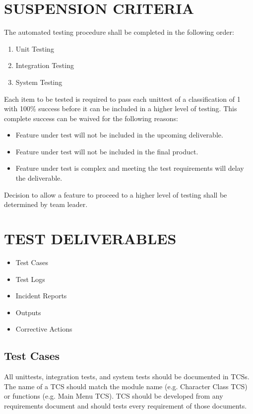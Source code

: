 \documentclass[report]{article}
\begin{document}
\section[SUSPENSION CRITERIA]{SUSPENSION CRITERIA}
The automated testing procedure shall be completed in the following order:
\begin{enumerate}
\item Unit Testing
\item Integration Testing
\item System Testing
\end{enumerate}
Each item to be tested is required to pass each unittest of a classification of 1 with 100\% success before it can be included in a higher level of testing. This complete success can be waived for the following reasons:
\begin{itemize}
\item Feature under test will not be included in the upcoming deliverable.
\item Feature under test will not be included in the final product.
\item Feature under test is complex and meeting the test requirements will delay the deliverable.
\end{itemize}
Decision to allow a feature to proceed to a higher level of testing shall be determined by team leader.

\section[TEST DELIVERABLES]{TEST DELIVERABLES}
\begin{itemize}
\item Test Cases
\item Test Logs
\item Incident Reports
\item Outputs
\item Corrective Actions
\end{itemize}

\subsection{Test Cases}

All unittests, integration tests, and system tests should be documented in TCSs. The name of a TCS should match the module name (e.g. Character Class TCS) or functions (e.g. Main Menu TCS). TCS should be developed from any requirements document and should tests every requirement of those documents.
\end{document}
